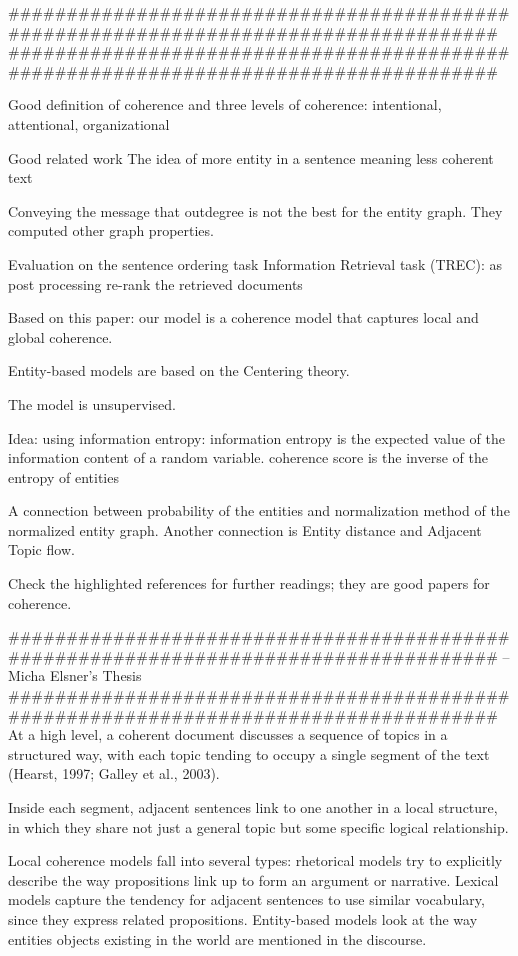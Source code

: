 #####################################################################################
\cite{petersencasper15}
#####################################################################################

Good definition of coherence and three levels of coherence: intentional, attentional, organizational 

Good related work
The idea of more entity in a sentence meaning less coherent text

Conveying the message that outdegree is not the best for the entity graph. They computed other graph properties.

Evaluation on 
	the sentence ordering task
	Information Retrieval task (TREC): as post processing re-rank the retrieved documents

Based on this paper: our model is a coherence model that captures local and global coherence.

Entity-based models are based on the Centering theory.

The model is unsupervised.

Idea: using information entropy: information entropy is the expected value of the information content of a random variable. coherence score is the inverse of the entropy of entities

A connection between probability of the entities and normalization method of the normalized entity graph. Another connection is Entity distance and Adjacent Topic flow.

Check the highlighted references for further readings; they are good papers for coherence.

#####################################################################################
 \cite{} -- Micha Elsner's Thesis
#####################################################################################
At a high level, a coherent document discusses a sequence of topics in a structured way, with each topic
tending to occupy a single segment of the text (Hearst, 1997; Galley et al., 2003).


Inside each segment, adjacent sentences link to one another in a local structure, in which they share
not just a general topic but some specific logical relationship.

Local coherence models fall into several types: rhetorical models try to explicitly describe the way propositions link up to form an argument or narrative. 
Lexical models capture the tendency for adjacent sentences to use similar vocabulary, since they
express related propositions. 
Entity-based models look at the way entities objects existing in the world are
mentioned in the discourse.

